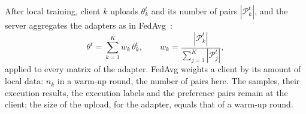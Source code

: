 After local training, client $k$ uploads $\theta_k^{t}$ and its number
of pairs $|\mathcal{P}_k^{t}|$, and the server aggregates the adapters
as in FedAvg~\cite{mcmahan2017fedavg}:
\begin{equation}
  \theta^{t} = \sum_{k=1}^{K} w_k \, \theta_k^{t},
  \qquad
  w_k = \frac{|\mathcal{P}_k^{t}|}{\sum_{j=1}^{K} |\mathcal{P}_j^{t}|},
  \label{eq:aggregation}
\end{equation}
applied to every matrix of the adapter. FedAvg weights a client by its
amount of local data: $n_k$ in a warm-up round, the number of pairs
here. The samples, their execution results, the execution labels and the
preference pairs remain at the client; the size of the upload,
 for the adapter, equals that of a warm-up round.
